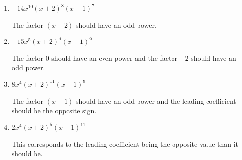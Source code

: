 \documentclass{extbook}[14pt]
\begin{document}
\begin{enumerate}
{\begin{enumerate}[label=\Alph*.]
* This is the correct option.
\item \( -14x^{10} (x + 2)^{8} (x - 1)^{7} \)

The factor $(x + 2)$ should have an odd power.
\item \( -15x^{5} (x + 2)^{4} (x - 1)^{9} \)

The factor $0$ should have an even power and the factor $-2$ should have an odd power.
\item \( 8x^{4} (x + 2)^{11} (x - 1)^{8} \)

The factor $(x - 1)$ should have an odd power and the leading coefficient should be the opposite sign.
\item \( 2x^{4} (x + 2)^{5} (x - 1)^{11} \)

This corresponds to the leading coefficient being the opposite value than it should be.
\end{enumerate}

}
\end{enumerate}
\end{document}
